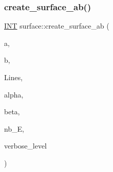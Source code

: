 \subsubsection{\texorpdfstring{create\+\_\+surface\+\_\+ab()}{create\_surface\_ab()}}
{\footnotesize\ttfamily \mbox{\hyperlink{galois_8h_a09fddde158a3a20bd2dcadb609de11dc}{I\+NT}} surface\+::create\+\_\+surface\+\_\+ab (\begin{DoxyParamCaption}\item[{\mbox{\hyperlink{galois_8h_a09fddde158a3a20bd2dcadb609de11dc}{I\+NT}}}]{a,  }\item[{\mbox{\hyperlink{galois_8h_a09fddde158a3a20bd2dcadb609de11dc}{I\+NT}}}]{b,  }\item[{\mbox{\hyperlink{galois_8h_a09fddde158a3a20bd2dcadb609de11dc}{I\+NT}} $\ast$}]{Lines,  }\item[{\mbox{\hyperlink{galois_8h_a09fddde158a3a20bd2dcadb609de11dc}{I\+NT}} \&}]{alpha,  }\item[{\mbox{\hyperlink{galois_8h_a09fddde158a3a20bd2dcadb609de11dc}{I\+NT}} \&}]{beta,  }\item[{\mbox{\hyperlink{galois_8h_a09fddde158a3a20bd2dcadb609de11dc}{I\+NT}} \&}]{nb\+\_\+E,  }\item[{\mbox{\hyperlink{galois_8h_a09fddde158a3a20bd2dcadb609de11dc}{I\+NT}}}]{verbose\+\_\+level }\end{DoxyParamCaption})}

\mbox{\label{classsurface_a39c89c2c3826d0d79d54ec69fb35a35e}} 

